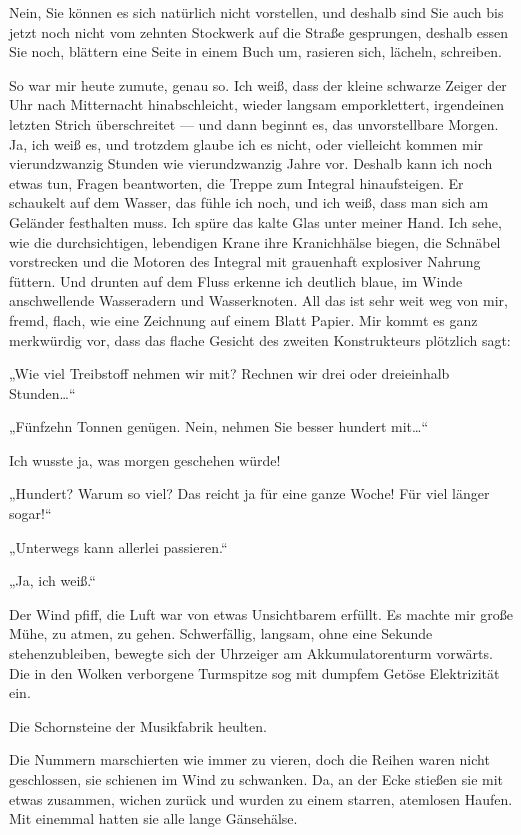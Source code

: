 Nein, Sie können es sich natürlich nicht vorstellen, und deshalb
sind Sie auch bis jetzt noch nicht vom zehnten Stockwerk auf die
Straße gesprungen, deshalb essen Sie noch, blättern eine Seite in
einem Buch um, rasieren sich, lächeln, schreiben.

So war mir heute zumute, genau so. Ich weiß, dass der kleine
schwarze Zeiger der Uhr nach Mitternacht hinabschleicht, wieder
langsam emporklettert, irgendeinen letzten Strich überschreitet —
und dann beginnt es, das unvorstellbare Morgen. Ja, ich weiß es,
und trotzdem glaube ich es nicht, oder vielleicht kommen mir
vierundzwanzig Stunden wie vierundzwanzig Jahre vor. Deshalb kann
ich noch etwas tun, Fragen beantworten, die Treppe zum Integral
hinaufsteigen. Er schaukelt auf dem Wasser, das fühle ich noch, und
ich weiß, dass man sich am Geländer festhalten muss. Ich spüre das
kalte Glas unter meiner Hand. Ich sehe, wie die durchsichtigen,
lebendigen Krane ihre Kranichhälse biegen, die Schnäbel vorstrecken
und die Motoren des Integral mit grauenhaft explosiver Nahrung
füttern. Und drunten auf dem Fluss erkenne ich deutlich blaue, im
Winde anschwellende Wasseradern und Wasserknoten. All das ist sehr
weit weg von mir, fremd, flach, wie eine Zeichnung auf einem Blatt
Papier. Mir kommt es ganz merkwürdig vor, dass das flache Gesicht
des zweiten Konstrukteurs plötzlich sagt:

„Wie viel Treibstoff
nehmen wir mit? Rechnen wir drei oder dreieinhalb Stunden\ldots{}“

„Fünfzehn Tonnen genügen. Nein, nehmen Sie besser hundert mit\ldots{}“

Ich wusste ja, was morgen geschehen würde!

„Hundert? Warum so viel?
Das reicht ja für eine ganze Woche! Für viel länger sogar!“

„Unterwegs kann allerlei passieren.“

„Ja, ich weiß.“

Der Wind pfiff, die Luft war von etwas Unsichtbarem erfüllt. Es
machte mir große Mühe, zu atmen, zu gehen. Schwerfällig, langsam,
ohne eine Sekunde stehenzubleiben, bewegte sich der Uhrzeiger am
Akkumulatorenturm vorwärts. Die in den Wolken verborgene Turmspitze
sog mit dumpfem Getöse Elektrizität ein.

Die Schornsteine der Musikfabrik heulten.

Die Nummern marschierten wie immer zu vieren,
doch die Reihen waren nicht geschlossen, sie schienen im Wind zu
schwanken. Da, an der Ecke stießen sie mit etwas zusammen, wichen
zurück und wurden zu einem starren, atemlosen Haufen. Mit einemmal
hatten sie alle lange Gänsehälse.

